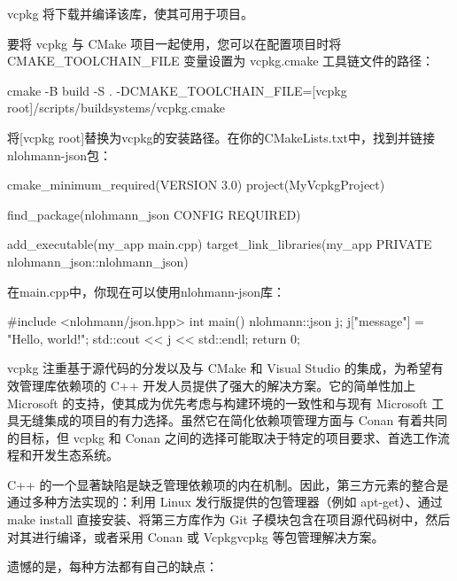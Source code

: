vcpkg 将下载并编译该库，使其可用于项目。

要将 vcpkg 与 CMake 项目一起使用，您可以在配置项目时将 CMAKE\_TOOLCHAIN\_FILE 变量设置为 vcpkg.cmake 工具链文件的路径：

\begin{shell}
cmake -B build -S . -DCMAKE_TOOLCHAIN_FILE=[vcpkg root]/scripts/buildsystems/vcpkg.cmake
\end{shell}

将[vcpkg root]替换为vcpkg的安装路径。在你的CMakeLists.txt中，找到并链接nlohmann-json包：

\begin{cmake}
cmake_minimum_required(VERSION 3.0)
project(MyVcpkgProject)

find_package(nlohmann_json CONFIG REQUIRED)

add_executable(my_app main.cpp)
target_link_libraries(my_app PRIVATE nlohmann_json::nlohmann_json)
\end{cmake}

在main.cpp中，你现在可以使用nlohmann-json库：

\begin{cpp}
#include <nlohmann/json.hpp>
int main() {
    nlohmann::json j;
    j["message"] = "Hello, world!";
    std::cout << j << std::endl;
    return 0;
}
\end{cpp}

vcpkg 注重基于源代码的分发以及与 CMake 和 Visual Studio 的集成，为希望有效管理库依赖项的 C++ 开发人员提供了强大的解决方案。它的简单性加上 Microsoft 的支持，使其成为优先考虑与构建环境的一致性和与现有 Microsoft 工具无缝集成的项目的有力选择。虽然它在简化依赖项管理方面与 Conan 有着共同的目标，但 vcpkg 和 Conan 之间的选择可能取决于特定的项目要求、首选工作流程和开发生态系统。


C++ 的一个显著缺陷是缺乏管理依赖项的内在机制。因此，第三方元素的整合是通过多种方法实现的：利用 Linux 发行版提供的包管理器（例如 apt-get）、通过 make install 直接安装、将第三方库作为 Git 子模块包含在项目源代码树中，然后对其进行编译，或者采用 Conan 或 Vcpkgvcpkg 等包管理解决方案。

遗憾的是，每种方法都有自己的缺点：

